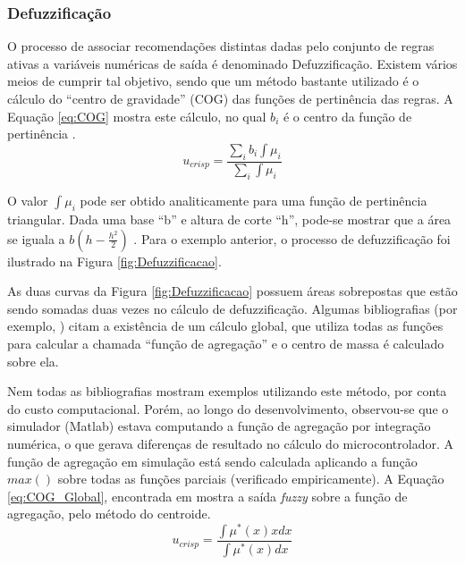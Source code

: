 	
	
	\subsubsection{Defuzzificação}
	
	O processo de associar recomendações distintas dadas pelo conjunto de regras
	ativas a variáveis numéricas de saída é denominado Defuzzificação. Existem
	vários meios de cumprir tal objetivo, sendo que um método bastante utilizado é
	o cálculo do ``centro de gravidade'' (COG) das funções de pertinência das
	regras. A Equação \ref{eq:COG} mostra este cálculo, no qual $b_i$ é o centro da
	função de pertinência \cite{fuzzy_passino}.
\begin{equation}
	\label{eq:COG}
	u_{crisp} = \frac{\sum_i b_i \int \mu_i}{\sum_i \int \mu_i}
\end{equation}

	O valor $\int \mu_i$ pode ser obtido analiticamente para uma função de
	pertinência triangular. Dada uma base ``b'' e altura de corte ``h'',
	pode-se mostrar que a área se iguala a $b(h-\frac{h^2}{2})$
	\cite{fuzzy_passino}. Para o exemplo anterior, o processo de defuzzificação foi
	ilustrado na Figura \ref{fig:Defuzzificacao}.
	
	

	As duas curvas da Figura \ref{fig:Defuzzificacao} possuem áreas sobrepostas que estão
	sendo somadas duas vezes no cálculo de defuzzificação. Algumas bibliografias (por exemplo, 
	) citam a existência de um cálculo global, que utiliza todas 
	as funções para calcular a chamada ``função de agregação'' e o centro de massa é calculado
	sobre ela. 
	
	Nem todas as bibliografias mostram exemplos utilizando este método, por conta do custo 
	computacional. Porém, ao longo do desenvolvimento, observou-se que o simulador (Matlab) 
	estava computando a função de agregação por integração numérica, o que gerava diferenças 
	de resultado no cálculo do microcontrolador. A função de agregação em simulação está sendo 
	calculada aplicando a função $max()$ sobre todas as funções parciais (verificado 
	empiricamente). A Equação \ref{eq:COG_Global}, encontrada em  
	mostra a saída \textit{fuzzy} sobre a função de agregação, pelo método do centroide.
	\begin{equation}
		\label{eq:COG_Global}
		u_{crisp} = \frac{\int \mu^* (x) x dx}{\int \mu^* (x) dx}
	\end{equation}
	
